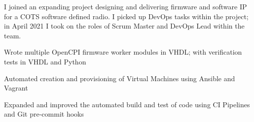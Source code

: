 {}
I joined an expanding project designing and delivering firmware and software IP for a COTS software defined radio. I picked up DevOps tasks within the project; in April 2021 I took on the roles of Scrum Master and DevOps Lead within the team.
\vspace{0.25em}
\begin{tightemize}
    \item Wrote multiple OpenCPI firmware worker modules in VHDL; with verification tests in VHDL and Python
    \item Automated creation and provisioning of Virtual Machines using Ansible and Vagrant
    \item Expanded and improved the automated build and test of code using CI Pipelines and Git pre-commit hooks
\end{tightemize}
\sectionsep
